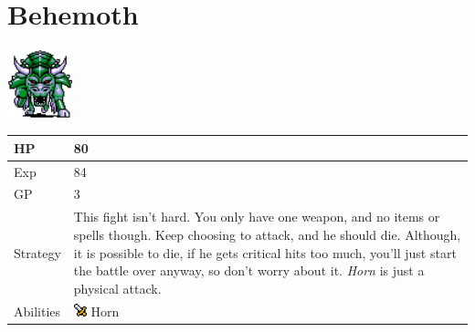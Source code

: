 \section{Behemoth}
\label{monster:behemoth}

\includegraphics[height=2cm,keepaspectratio]{./resources/monster/behemoth}

\begin{longtable}{ l p{9cm} }
	HP
	& 80
\\ \hline
	Exp
	& 84
\\ \hline
	GP
	& 3
\\ \hline
	Strategy
	& This fight isn't hard. You only have one weapon, and no items or spells though. Keep choosing to attack, and he should die. Although, it is possible to die, if he gets critical hits too much, you'll just start the battle over anyway, so don't worry about it. \textit{Horn} is just a physical attack.
\\ \hline
	Abilities
	& \includegraphics[height=1em,keepaspectratio]{./resources/effects/damage} Horn
\end{longtable}
